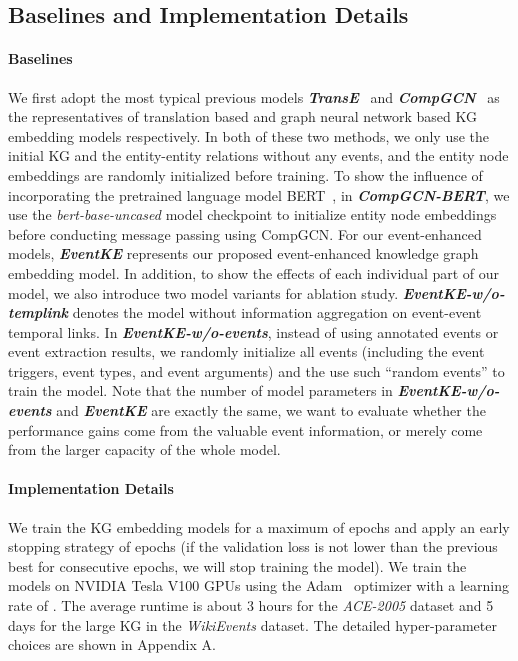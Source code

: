 \subsection{Baselines and Implementation Details}
\paragraph{Baselines}
We first adopt the most typical previous models \textbf{\emph{TransE}}~\cite{transe} and \textbf{\emph{CompGCN}}~\cite{compgcn} as the representatives of translation based and graph neural network based KG embedding models respectively.
In both of these two methods, we only use the initial KG and the entity-entity relations without any events, and the entity node embeddings are randomly initialized before training.
To show the influence of incorporating the pretrained language model BERT~\cite{bert}, in \textbf{\emph{CompGCN-BERT}}, we use the \emph{bert-base-uncased} model checkpoint to initialize entity node embeddings before conducting message passing using CompGCN.
For our event-enhanced models, \textbf{\emph{EventKE}} represents our proposed event-enhanced knowledge graph embedding model.
In addition, to show the effects of each individual part of our model, we also introduce two model variants for ablation study.
\textbf{\emph{EventKE-w/o-templink}} denotes the model without information aggregation on event-event temporal links. 
In \textbf{\emph{EventKE-w/o-events}}, instead of using annotated events or event extraction results, we randomly initialize all events (including the event triggers, event types, and event arguments) and the use such ``random events'' to train the model.
Note that the number of model parameters in \textbf{\emph{EventKE-w/o-events}} and \textbf{\emph{EventKE}} are exactly the same, we want to evaluate whether the performance gains come from the valuable event information, or merely come from the larger capacity of the whole model.

\paragraph{Implementation Details}
We train the KG embedding models for a maximum of  epochs and apply an early stopping strategy of  epochs (if the validation loss is not lower than the previous best for  consecutive epochs, we will stop training the model).
We train the models on NVIDIA Tesla V100 GPUs using the Adam~\cite{adam} optimizer with a learning rate of .
The average runtime is about 3 hours for the \emph{ACE-2005} dataset and 5 days for the large KG in the \emph{WikiEvents} dataset.
The detailed hyper-parameter choices are shown in Appendix A.

